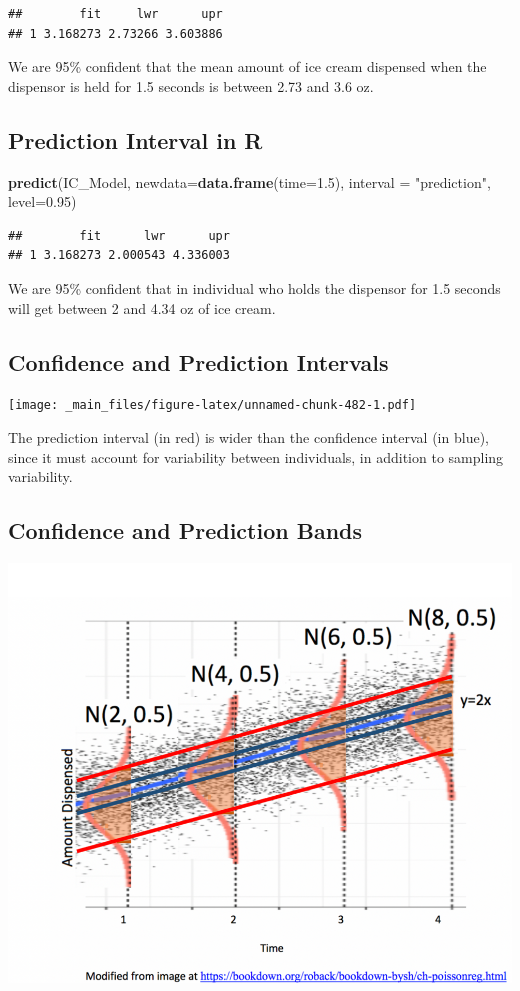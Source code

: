 \documentclass[]{book}
\newenvironment{Shaded}{\begin{snugshade}}{\end{snugshade}}
\newcommand{\KeywordTok}[1]{\textcolor[rgb]{0.13,0.29,0.53}{\textbf{#1}}}
\newcommand{\DataTypeTok}[1]{\textcolor[rgb]{0.13,0.29,0.53}{#1}}
\newcommand{\FloatTok}[1]{\textcolor[rgb]{0.00,0.00,0.81}{#1}}
\newcommand{\StringTok}[1]{\textcolor[rgb]{0.31,0.60,0.02}{#1}}
\newcommand{\NormalTok}[1]{#1}
\begin{document}
\begin{verbatim}
##        fit     lwr      upr
## 1 3.168273 2.73266 3.603886
\end{verbatim}

We are 95\% confident that the mean amount of ice cream dispensed when
the dispensor is held for 1.5 seconds is between 2.73 and 3.6 oz.

\subsection{Prediction Interval in R}\label{prediction-interval-in-r}

\begin{Shaded}
\begin{Highlighting}[]
\KeywordTok{predict}\NormalTok{(IC_Model, }\DataTypeTok{newdata=}\KeywordTok{data.frame}\NormalTok{(}\DataTypeTok{time=}\FloatTok{1.5}\NormalTok{), }\DataTypeTok{interval =} \StringTok{"prediction"}\NormalTok{, }\DataTypeTok{level=}\FloatTok{0.95}\NormalTok{)}
\end{Highlighting}
\end{Shaded}

\begin{verbatim}
##        fit      lwr      upr
## 1 3.168273 2.000543 4.336003
\end{verbatim}

We are 95\% confident that in individual who holds the dispensor for 1.5
seconds will get between 2 and 4.34 oz of ice cream.

\subsection{Confidence and Prediction
Intervals}\label{confidence-and-prediction-intervals}

\texttt{[image: \_main\_files/figure-latex/unnamed-chunk-482-1.pdf]}

The prediction interval (in red) is wider than the confidence interval
(in blue), since it must account for variability between individuals, in
addition to sampling variability.

\subsection{Confidence and Prediction
Bands}\label{confidence-and-prediction-bands}

\includegraphics[width=0.75\linewidth]{C_P_Band}
\end{document}
